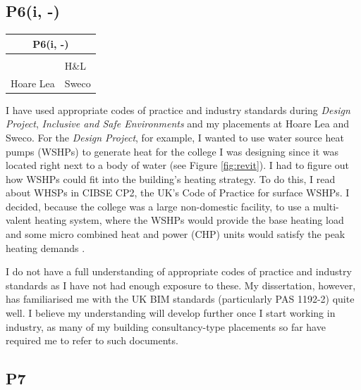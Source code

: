 \subsection*{P6(i, -)}

\begin{table}
	\begin{tabular}{|ll|}
		\hline
		\multicolumn{2}{|c|}{\cellcolor[HTML]{F8A102}\textbf{P6(i, -) \nomaster}} \\ \hline
		\PRJ & \DST \\
		\ISE & H\&L \\
		Hoare Lea & Sweco \\ \hline
	\end{tabular}
\end{table}

I have used appropriate codes of practice and industry standards during \textit{Design Project}, \textit{Inclusive and Safe Environments} and my placements at Hoare Lea and Sweco.
For the \textit{Design Project}, for example, I wanted to use water source heat pumps (WSHPs) to generate heat for the college I was designing since it was located right next to a body of water (see Figure \ref{fig:revit}).
I had to figure out how WSHPs could fit into the building's heating strategy.
To do this, I read about WHSPs in CIBSE CP2, the UK's Code of Practice for surface WSHPs.
I decided, because the college was a large non-domestic facility, to use a multi-valent heating system, where the WSHPs would provide the base heating load and some micro combined heat and power (CHP) units would satisfy the peak heating demands \citep[pp.~12,~38]{CP22016}.

I do not have a full understanding of appropriate codes of practice and industry standards as I have not had enough exposure to these.
My dissertation, however, has familiarised me with the UK BIM standards (particularly PAS 1192-2) quite well.
I believe my understanding will develop further once I start working in industry, as many of my building consultancy-type placements so far have required me to refer to such documents.






\subsection*{P7}


